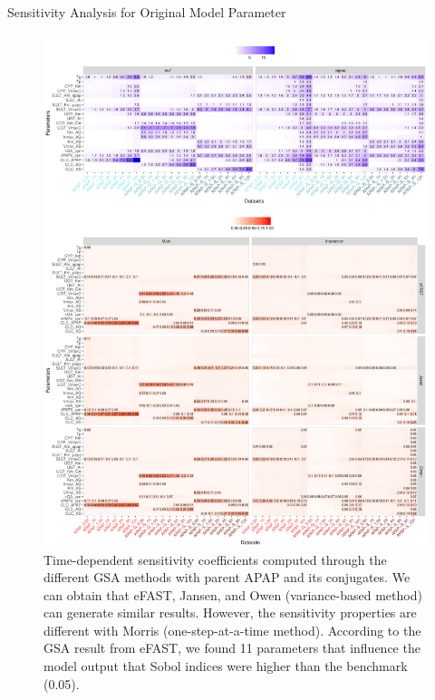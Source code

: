 \documentclass[xcolor=table]{beamer}
\begin{document}
\begin{frame}[t]
\begin{columns}[t]
\begin{column}{0.23\paperwidth}
\begin{block}{Sensitivity Analysis for Original Model Parameter}
\begin{figure}
\includegraphics[width=0.98\linewidth]{fig3.pdf}
\caption{Time-dependent sensitivity coefficients computed through the different GSA methods with parent APAP and its conjugates. 
We can obtain that eFAST, Jansen, and Owen (variance-based method) can generate similar results. However, the sensitivity properties are different with Morris (one-step-at-a-time method).
According to the GSA result from eFAST, we found 11 parameters that influence the model output that Sobol indices were higher than the benchmark (0.05).
}
\end{figure}
\end{block}


\end{column} %


\end{columns}
\end{frame}
\end{document}
